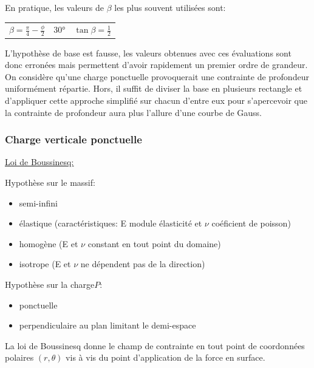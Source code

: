             En pratique, les valeurs de $\beta$ les plus souvent utilisées sont:
            
            \begin{center}
            \begin{tabular}{ccc}
                 $\beta = \frac{\pi}{4}-\frac{\phi}{2}$ & $30°$ & $\tan \beta = \frac{1}{2}$  
            \end{tabular}
            \end{center} 
            
            L'hypothèse de base est fausse, les valeurs obtenues avec ces évaluations sont donc erronées mais permettent d'avoir rapidement un premier ordre de grandeur. On considère qu'une charge ponctuelle provoquerait une contrainte de profondeur uniformément répartie. Hors, il suffit de diviser la base en plusieurs rectangle et d'appliquer cette approche simplifié sur chacun d'entre eux pour s'apercevoir que la contrainte de profondeur aura plus l'allure d'une courbe de Gauss.
            
            \subsubsection{Charge verticale ponctuelle}
            
            \underline{Loi de Boussinesq:} 
            
            Hypothèse sur le massif:
            \begin{itemize}
                \item semi-infini
                \item élastique (caractéristiques: E module élasticité et $\nu$ coéficient de poisson)
                \item homogène (E et $\nu$ constant en tout point du domaine)
                \item isotrope (E et $\nu$ ne dépendent pas de la direction)
            \end{itemize} 
            
            Hypothèse sur la charge$P$:
            \begin{itemize}
                \item ponctuelle
                \item perpendiculaire au plan limitant le demi-espace
            \end{itemize} 
            
            La loi de Boussinesq donne le champ de contrainte en tout point de coordonnées polaires $(r, \theta)$ vis à vis du point d'application de la force en surface.
            
